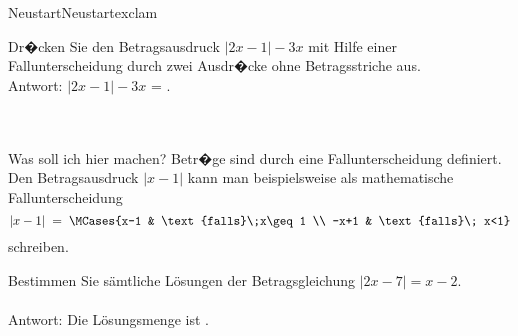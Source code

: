 \begin{MXContent}{Neustart}{Neustart}{exclam}
\begin{MExercise}
Dr�cken Sie den Betragsausdruck $|2x-1|-3x$ mit Hilfe einer Fallunterscheidung durch zwei Ausdr�cke ohne Betragsstriche aus.\\
Antwort: $|2x-1|-3x$ = .\\
\ \\ \ \\
\begin{MHint}{Was soll ich hier machen?}
Betr�ge sind durch eine Fallunterscheidung definiert.
Den Betragsausdruck $|x-1|$ kann man beispielsweise als mathematische Fallunterscheidung
$$
|x-1| \;=\; \MCases{x-1 & \text{falls}\;x\geq 1 \\ -x+1 & \text{falls}\; x<1}
$$
schreiben.\\
\end{MHint}
\end{MExercise}

% 

\begin{MExercise}
Bestimmen Sie s\"amtliche L\"osungen der Betragsgleichung $|2x-7|=x-2$.
\ \\ \ \\
Antwort: Die L\"osungsmenge ist .\\
\end{MExercise}



\end{MXContent}
